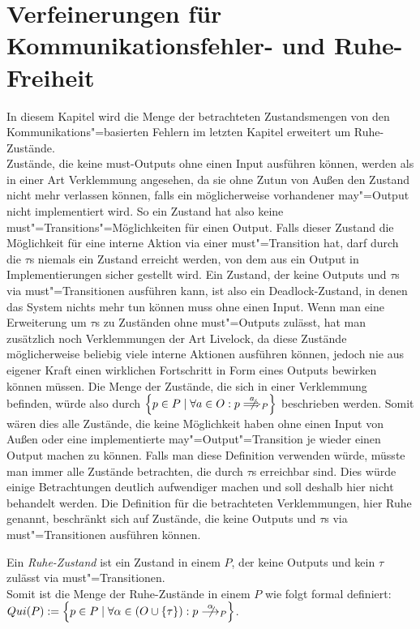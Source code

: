 \chapter{Verfeinerungen für Kommunikationsfehler- und Ruhe-Freiheit}


In diesem Kapitel wird die Menge der betrachteten Zustandsmengen von den
Kommunikations"=basierten Fehlern im letzten Kapitel erweitert um
Ruhe-Zustände.\\
Zustände, die keine must-Outputs ohne einen Input ausführen können, werden als
in einer Art Verklemmung angesehen, da sie ohne Zutun von Außen den Zustand
nicht mehr verlassen können, falls ein möglicherweise vorhandener may"=Output
nicht implementiert wird. So ein Zustand hat also keine
must"=Transitions"=Möglichkeiten für einen Output. Falls dieser Zustand die
Möglichkeit für eine interne Aktion via einer must"=Transition hat, darf durch
die $\tau$s niemals ein Zustand erreicht werden, von dem aus ein Output in
Implementierungen sicher gestellt wird. Ein Zustand, der keine Outputs und
$\tau$s via must"=Transitionen ausführen kann, ist also ein Deadlock-Zustand,
in denen das System nichts mehr tun können muss ohne einen Input. Wenn man eine
Erweiterung um $\tau$s zu Zuständen ohne must"=Outputs zulässt, hat man
zusätzlich noch Verklemmungen der Art Livelock, da diese Zustände
möglicherweise beliebig viele interne Aktionen ausführen können, jedoch nie aus
eigener Kraft einen wirklichen Fortschritt in Form eines Outputs bewirken
können müssen. Die Menge der Zustände, die sich in einer Verklemmung
befinden, würde also durch $\left\{p\in P\mid \forall a\in O: p\nweakmust[a]_P
\right\}$ beschrieben werden. Somit wären dies alle Zustände, die keine
Möglichkeit haben ohne einen Input von Außen oder eine implementierte
may"=Output"=Transition je wieder einen Output machen zu können. Falls man
diese Definition verwenden würde, müsste man immer alle Zustände betrachten,
die durch $\tau$s erreichbar sind. Dies würde einige Betrachtungen deutlich
aufwendiger machen und soll deshalb hier nicht behandelt werden. Die Definition
für die betrachteten Verklemmungen, hier Ruhe genannt, beschränkt sich auf
Zustände, die keine Outputs und $\tau$s via must"=Transitionen ausführen
können.

\begin{Def}[Ruhe]
  Ein \emph{Ruhe-Zustand} ist ein Zustand in einem \MEIO{} $P$, der keine
  Outputs und kein $\tau$ zulässt via must"=Transitionen.\\
  Somit ist die Menge der Ruhe-Zustände in einem \MEIO{} $P$ wie folgt formal
  definiert: $Qui(P):=\left\{p\in P\mid \forall\alpha\in (O\cup\{\tau\}):p
  \nmust[\alpha]_P\right\}$.
\end{Def}

